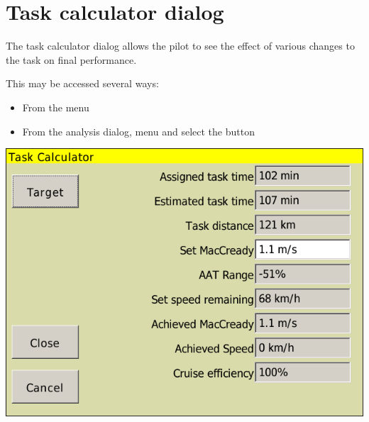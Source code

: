 




\section{Task calculator dialog}\label{sec:task-calc-dial}
The task calculator dialog allows the pilot to see the effect of
various changes to the task on final performance.

This may be accessed several ways: 
\begin{itemize}
\item From the menu 
\begin{quote}
\blink{}
\end{quote}
\item From the analysis dialog, menu \blink{} and select
 the button 
\end{itemize}

\begin{center}
\includegraphics[angle=0,width=0.8\linewidth,keepaspectratio='true']{figures/dialog-taskcalc3.png}
\end{center}

